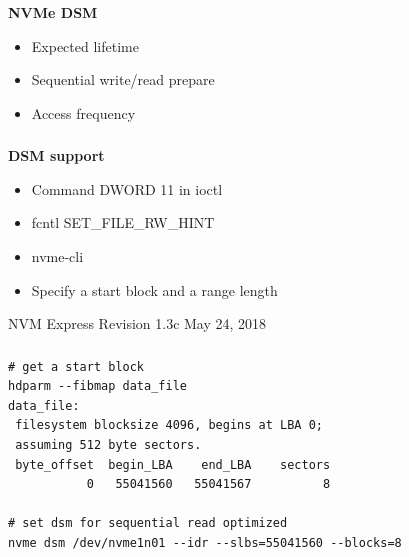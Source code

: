 \documentclass[usenames,dvipsnames, 18pt, compress, aspectratio=169]{beamer}
\begin{document}
\begin{frame}
    \frametitle{}
    \begin{center}
    \textbf{NVMe DSM}

        \begin{itemize}[label={\MVRightarrow}]
            \item Expected lifetime
            \item Sequential write/read prepare
            \item Access frequency
        \end{itemize}

    \end{center}
\end{frame}

\begin{frame}
    \frametitle{}
    \begin{center}
    \textbf{DSM support}

        \begin{itemize}[label={\MVRightarrow}]
            \item Command DWORD 11 in ioctl
            \item fcntl SET\_FILE\_RW\_HINT
            \item nvme-cli
            \item Specify a start block and a range length
        \end{itemize}

        \normalsize{NVM Express Revision 1.3c May 24, 2018}

    \end{center}
\end{frame}

\begin{frame}[fragile]{}
    \frametitle{}
    \begin{center}

        \begin{verbatim}
# get a start block
hdparm --fibmap data_file
data_file:
 filesystem blocksize 4096, begins at LBA 0;
 assuming 512 byte sectors.
 byte_offset  begin_LBA    end_LBA    sectors
           0   55041560   55041567          8

# set dsm for sequential read optimized
nvme dsm /dev/nvme1n01 --idr --slbs=55041560 --blocks=8
        \end{verbatim}

    \end{center}
\end{frame}
\end{document}
